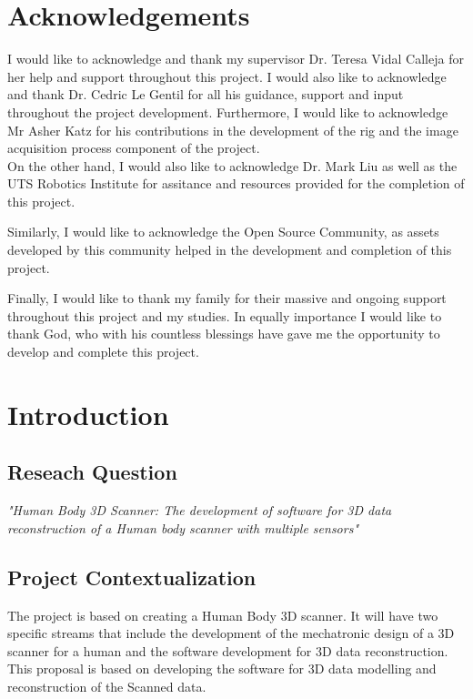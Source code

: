 \documentclass[12pt]{report}
\begin{document}
\enlargethispage{\baselineskip}
\chapter*{Acknowledgements}
I would like to acknowledge and thank my supervisor Dr. Teresa Vidal Calleja for her help and support throughout this project. I would also like to acknowledge and thank Dr. Cedric Le Gentil for all his guidance, support and input throughout the project development.
Furthermore, I would like to acknowledge Mr Asher Katz for his contributions in the development of the rig  and the image acquisition process component of the project.\\
On the other hand, I would also like to acknowledge Dr. Mark Liu as well as the UTS Robotics Institute for assitance and resources provided for the completion of this project.

Similarly, I would like to acknowledge the Open Source Community, as assets developed by this community helped in the development and completion of this project.

Finally, I would like to thank my family for their massive and ongoing support throughout this project and my studies. In equally importance I would like to thank God, who with his countless blessings have gave me the opportunity to develop and complete this project.
\tableofcontents
\listoffigures
\listoftables

\newpage
\setcounter{page}{1}

\chapter{Introduction}

\section{Reseach Question}
\textit{\large{"Human Body 3D Scanner: The development of software for 3D data reconstruction of a Human body scanner with multiple sensors" }}

\section{Project Contextualization}
The project is based on creating a Human Body 3D scanner.
It will have two specific streams that include the development of the mechatronic design of a 3D scanner for a human and the software development for 3D data reconstruction. 
This proposal is based on developing the software for 3D data modelling and reconstruction of the Scanned data.
\end{document}

